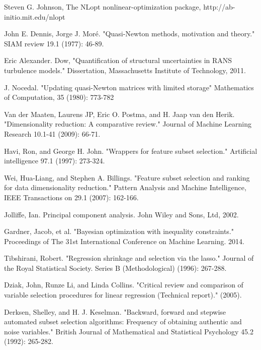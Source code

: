 \documentclass[a4paper,onecolumn]{article}
\theoremstyle{remark}
\begin{document}
\begin{thebibliography}{9}
Steven G. Johnson,
The NLopt nonlinear-optimization package, 
http://ab-initio.mit.edu/nlopt

John E. Dennis, Jorge J. Moré.
"Quasi-Newton methods, motivation and theory." SIAM review 19.1 (1977): 46-89.

Eric Alexander. Dow,
"Quantification of structural uncertainties in RANS turbulence models."
Dissertation, Massachusetts Institute of Technology, 2011.

J. Nocedal.
"Updating quasi-Newton matrices with limited storage"
Mathematics of Computation, 35 (1980): 773-782

Van der Maaten, Laurens JP, Eric O. Postma, and H. Jaap van den Herik. 
"Dimensionality reduction: A comparative review." 
Journal of Machine Learning Research 10.1-41 (2009): 66-71.

Havi, Ron, and George H. John. 
"Wrappers for feature subset selection."
Artificial intelligence 97.1 (1997): 273-324.

Wei, Hua-Liang, and Stephen A. Billings. 
"Feature subset selection and ranking for data dimensionality reduction." 
Pattern Analysis and Machine Intelligence, IEEE Transactions on 29.1 (2007): 162-166.

Jolliffe, Ian. Principal component analysis. John Wiley and Sons, Ltd, 2002.

Gardner, Jacob, et al. 
"Bayesian optimization with inequality constraints."
Proceedings of The 31st International Conference on Machine Learning. 2014.

Tibshirani, Robert. 
"Regression shrinkage and selection via the lasso." 
Journal of the Royal Statistical Society. Series B (Methodological) (1996): 267-288.

Dziak, John, Runze Li, and Linda Collins. 
"Critical review and comparison of variable selection procedures for linear regression (Technical report)." (2005).

Derksen, Shelley, and H. J. Keselman. 
"Backward, forward and stepwise automated subset selection algorithms: Frequency of obtaining authentic and noise variables." 
British Journal of Mathematical and Statistical Psychology 45.2 (1992): 265-282.


\end{thebibliography}
\end{document}
